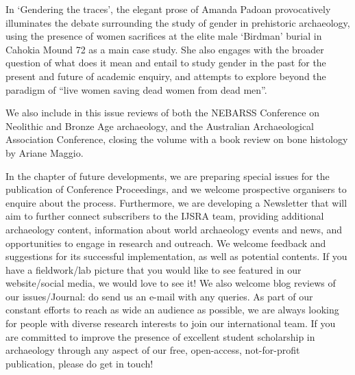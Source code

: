 In ‘Gendering the traces’, the elegant prose of Amanda Padoan provocatively illuminates the debate surrounding the study of gender in prehistoric archaeology, using the presence of women sacrifices at the elite male ‘Birdman’ burial in Cahokia Mound 72 as a main case study. She also engages with the broader question of what does it mean and entail to study gender in the past for the present and future of academic enquiry, and attempts to explore beyond the paradigm of “live women saving dead women from dead men”.

We also include in this issue reviews of both the NEBARSS Conference on Neolithic and Bronze Age archaeology, and the Australian Archaeological Association Conference, closing the volume with a book review on bone histology by Ariane Maggio.

In the chapter of future developments, we are preparing special issues for the publication of Conference Proceedings, and we welcome prospective organisers to enquire about the process. Furthermore, we are developing a Newsletter that will aim to further connect subscribers to the IJSRA team, providing additional archaeology content, information about world archaeology events and news, and opportunities to engage in research and outreach. We welcome feedback and suggestions for its successful implementation, as well as potential contents. If you have a fieldwork/lab picture that you would like to see featured in our website/social media, we would love to see it! We also welcome blog reviews of our issues/Journal: do send us an e-mail with any queries.
As part of our constant efforts to reach as wide an audience as possible, we are always looking for people with diverse research interests to join our international team. If you are committed to improve the presence of excellent student scholarship in archaeology through any aspect of our free, open-access, not-for-profit publication, please do get in touch!

\IJSRAclosing%